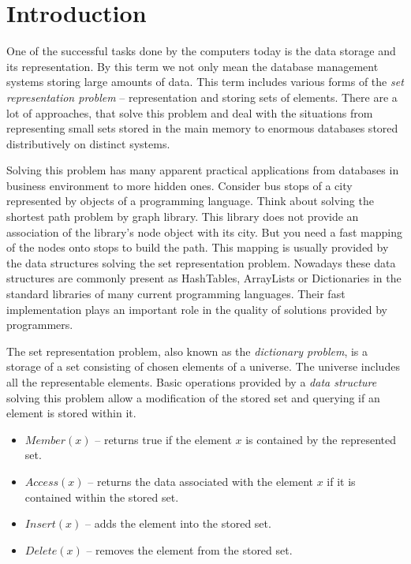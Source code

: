 \chapter{Introduction}
One of the successful tasks done by the computers today is the data storage and its representation. By this term we not only mean the database management systems storing large amounts of data. This term includes various forms of the \emph{set representation problem} \cite{VK-skripta} -- representation and storing sets of elements. There are a lot of approaches, that solve this problem and deal with the situations from representing small sets stored in the main memory to enormous databases stored distributively on distinct systems.

Solving this problem has many apparent practical applications from databases in business environment to more hidden ones. Consider bus stops of a city represented by objects of a programming language. Think about solving the shortest path problem by graph library. This library does not provide an association of the library's node object with its city. But you need a fast mapping of the nodes onto stops to build the path. This mapping is usually provided by the data structures solving the set representation problem. Nowadays these data structures are commonly present as HashTables, ArrayLists or Dictionaries in the standard libraries of many current programming languages. Their fast implementation plays an important role in the quality of solutions provided by programmers.

The set representation problem, also known as the \emph{dictionary problem}, is a storage of a set consisting of chosen elements of a universe. The universe includes all the representable elements. Basic operations provided by a \emph{data structure} solving this problem allow a modification of the stored set and querying if an element is stored within it.

\begin{itemize}
\item $Member(x)$ -- returns true if the element $x$ is contained by the represented set.
\item $Access(x)$ -- returns the data associated with the element $x$ if it is contained within the stored set.
\item $Insert(x)$ -- adds the element into the stored set.
\item $Delete(x)$ -- removes the element from the stored set.
\end{itemize}

